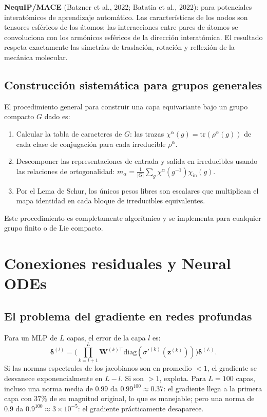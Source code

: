 \medskip
\noindent\textbf{NequIP/MACE} (Batzner et al., 2022; Batatia et al., 2022):
para potenciales interatómicos de aprendizaje automático. Las características
de los nodos son tensores esféricos de los átomos; las interacciones entre
pares de átomos se convoluciona con los armónicos esféricos de la dirección
interatómica. El resultado respeta exactamente las simetrías de traslación,
rotación y reflexión de la mecánica molecular.

\subsection{Construcción sistemática para grupos generales}
\label{subsec:grupo_general}

El procedimiento general para construir una capa equivariante bajo un grupo
compacto $G$ dado es:
\begin{enumerate}
  \item Calcular la tabla de caracteres de $G$: las trazas
        $\chi^\alpha(g) = \mathrm{tr}(\rho^\alpha(g))$ de cada clase de
        conjugación para cada irreducible $\rho^\alpha$.
  \item Descomponer las representaciones de entrada y salida en irreducibles
        usando las relaciones de ortogonalidad:
        $m_\alpha = \frac{1}{|G|}\sum_g \chi^\alpha(g^{-1})\chi_{\mathrm{in}}(g)$.
  \item Por el Lema de Schur, los únicos pesos libres son escalares que
        multiplican el mapa identidad en cada bloque de irreducibles equivalentes.
\end{enumerate}
Este procedimiento es completamente algorítmico y se implementa para cualquier
grupo finito o de Lie compacto.

\section{Conexiones residuales y Neural ODEs}
\label{sec:resnet_node}

\subsection{El problema del gradiente en redes profundas}
\label{subsec:grad_profundo}

Para un MLP de $L$ capas, el error de la capa $l$ es:
\[
  \bm{\delta}^{(l)}
  = \Biggl(\prod_{k=l+1}^L \bm{W}^{(k)\top}
    \mathrm{diag}(\sigma'^{(k)}(\bm{z}^{(k)}))\Biggr)\bm{\delta}^{(L)}.
\]
Si las normas espectrales de los jacobianos son en promedio $< 1$, el gradiente
se desvanece exponencialmente en $L-l$. Si son $> 1$, explota. Para $L = 100$
capas, incluso una norma media de $0.99$ da $0.99^{100} \approx 0.37$:
el gradiente llega a la primera capa con $37\%$ de su magnitud original,
lo que es manejable; pero una norma de $0.9$ da $0.9^{100} \approx 3\times 10^{-5}$:
el gradiente prácticamente desaparece.

